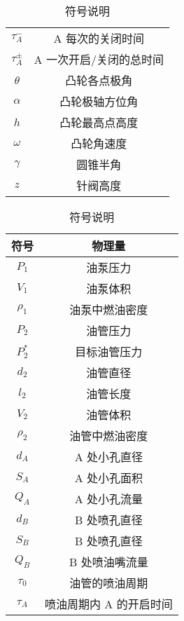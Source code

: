 \documentclass[18pt]{ctexart}
\begin{document}
\begin{table}[!ht]
\begin{minipage}{\textwidth}
\begin{minipage}[t]{0.5\textwidth}
\begin{tabular}{cc}
        $\tau_A^-$     & A 每次的关闭时间     \\
        $\tau_A^{\pm}$ & A 一次开启/关闭的总时间 \\
        $\theta$       & 凸轮各点极角        \\
        $\alpha$       & 凸轮极轴方位角       \\
        $h$            & 凸轮最高点高度       \\
        $\omega$       & 凸轮角速度         \\
        $\gamma$       & 圆锥半角          \\
        $z$            & 针阀高度          \\ \bottomrule
        \end{tabular}
        \end{minipage}
        \begin{minipage}[t]{0.5\textwidth}
        \centering
        \caption{符号说明}
        \begin{tabular}{cc}
        \toprule
        符号             & 物理量           \\
        \midrule
        $P_1$          & 油泵压力          \\
        $V_1$          & 油泵体积          \\
        $\rho_1$       & 油泵中燃油密度       \\
        $P_2$          & 油管压力          \\
        $P_2^*$        & 目标油管压力        \\
        $d_2$          & 油管直径          \\
        $l_2$          & 油管长度          \\
        $V_2$          & 油管体积          \\
        $\rho_2$       & 油管中燃油密度       \\
        $d_A$          & A 处小孔直径       \\
        $S_A$          & A 处小孔面积       \\
        $Q_A$          & A 处小孔流量       \\
        $d_B$          & B 处喷孔直径       \\
        $S_B$          & B 处喷孔直径       \\
        $Q_B$          & B 处喷油嘴流量      \\
        $\tau_0$       & 油管的喷油周期       \\
        $\tau_A$       & 喷油周期内 A 的开启时间 \\

\end{tabular}
\end{minipage}
\end{minipage}
\end{table}
\end{document}
